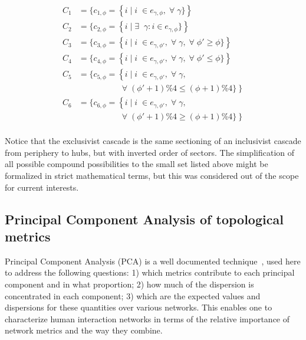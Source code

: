 \documentclass[%
aip,
jmp,%
amsmath,amssymb,
reprint,%
]{revtex4-1}
\begin{document}
\begin{equation}
\begin{split}
C_1&=\{c_{1,\phi}=\left\{i\mid i\;\in e_{\gamma,\phi}, \;\forall\; \gamma\}\right\} \\
C_2&=\{c_{2,\phi}=\left\{i\mid \exists \;\;\gamma: i \in e_{\gamma,\phi}\}\right\} \\
C_3&=\{c_{3,\phi}=\left\{i\mid i\;\in e_{\gamma,\phi'}, \;\forall\; \gamma,\;\forall\;\phi'\geq \phi\}\right\} \\
C_4&=\{c_{4,\phi}=\left\{i\mid i\;\in e_{\gamma,\phi'}, \;\forall\; \gamma,\;\forall\;\phi'\leq \phi\}\right\} \\
C_5&=\{c_{5,\phi}=\left\{i\mid i\;\in e_{\gamma,\phi'}, \;\forall\; \gamma,\right.\\
&\;\;\;\;\;\;\;\;\;\;\;\;\;\;\;\;\;\; \left.\;\forall\;(\phi'+1)\%4\leq (\phi+1)\%4\}\right\} \\
C_6&=\{c_{6,\phi}=\left\{i\mid i\;\in e_{\gamma,\phi'}, \;\forall\; \gamma,\right.\\
&\;\;\;\;\;\;\;\;\;\;\;\;\;\;\;\;\;\; \left.\;\forall\;(\phi'+1)\%4\geq (\phi+1)\%4\}\right\} \\
\end{split}
\end{equation}

Notice that the exclusivist cascade is the same sectioning of an inclusivist cascade from periphery to hubs, but with inverted order of sectors. 
The simplification of all possible compound possibilities to the small set listed above might be formalized in strict mathematical terms, but this was considered out of the scope for current interests.




\subsection{Principal Component Analysis of topological metrics}\label{sec:pca}
Principal Component Analysis (PCA) is a well documented technique~\cite{pca}, used here to address the following questions:	1) which metrics contribute to each principal component and in what proportion;	2) how much of the dispersion is concentrated in each component;	3) which are the expected values and dispersions for these quantities over various networks.	This enables one to characterize human interaction networks in terms of the relative importance of network metrics and the way they combine.
\end{document}
